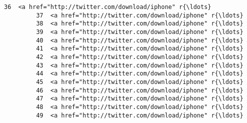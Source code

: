 \documentclass[11pt]{article}
\begin{document}
\begin{Verbatim}[commandchars=\\\{\}]
         36  <a href="http://twitter.com/download/iphone" r{\ldots}   
         37  <a href="http://twitter.com/download/iphone" r{\ldots}   
         38  <a href="http://twitter.com/download/iphone" r{\ldots}   
         39  <a href="http://twitter.com/download/iphone" r{\ldots}   
         40  <a href="http://twitter.com/download/iphone" r{\ldots}   
         41  <a href="http://twitter.com/download/iphone" r{\ldots}   
         42  <a href="http://twitter.com/download/iphone" r{\ldots}   
         43  <a href="http://twitter.com/download/iphone" r{\ldots}   
         44  <a href="http://twitter.com/download/iphone" r{\ldots}   
         45  <a href="http://twitter.com/download/iphone" r{\ldots}   
         46  <a href="http://twitter.com/download/iphone" r{\ldots}   
         47  <a href="http://twitter.com/download/iphone" r{\ldots}   
         48  <a href="http://twitter.com/download/iphone" r{\ldots}   
         49  <a href="http://twitter.com/download/iphone" r{\ldots}   
         

\end{Verbatim}
\end{document}
